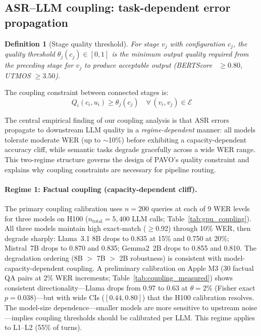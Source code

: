 \documentclass{article}
\newtheorem{definition}{Definition}
\begin{document}
\subsection{ASR--LLM coupling: task-dependent error propagation}
\label{sec:coupling}

\begin{definition}[Stage quality threshold]
For stage $v_j$ with configuration $c_j$, the quality threshold $\theta_j(c_j)\in[0,1]$ is the minimum output quality required from the preceding stage for $v_j$ to produce acceptable output (BERTScore~\citep{zhang2020bertscore,devlin2019bert} $\geq 0.80$, UTMOS $\geq 3.50$).
\end{definition}

The coupling constraint between connected stages is:
\begin{equation}
Q_i(c_i,u_i) \geq \theta_j(c_j) \quad \forall\,(v_i,v_j)\in\mathcal{E}
\label{eq:coupling}
\end{equation}

The central empirical finding of our coupling analysis is that ASR errors propagate to downstream LLM quality in a \emph{regime-dependent} manner: all models tolerate moderate WER (up to $\sim$10\%) before exhibiting a capacity-dependent accuracy cliff, while semantic tasks degrade gracefully across a wide WER range. This two-regime structure governs the design of PAVO's quality constraint and explains why coupling constraints are necessary for pipeline routing.

\paragraph{Regime 1: Factual coupling (capacity-dependent cliff).}
The primary coupling calibration uses $n=200$ queries at each of 9 WER levels for three models on H100 ($n_{\text{total}} = 5{,}400$ LLM calls; Table~\ref{tab:gpu_coupling}). All three models maintain high exact-match ($\geq$0.92) through 10\% WER, then degrade sharply: Llama~3.1 8B drops to 0.835 at 15\% and 0.750 at 20\%; Mistral~7B drops to 0.870 and 0.835; Gemma2~2B drops to 0.855 and 0.810. The degradation ordering (8B $>$ 7B $>$ 2B robustness) is consistent with model-capacity-dependent coupling. A preliminary calibration on Apple M3 (30 factual QA pairs at 2\% WER increments; Table~\ref{tab:coupling_measured}) shows consistent directionality---Llama drops from 0.97 to 0.63 at $\theta = 2\%$ (Fisher exact $p = 0.038$)---but with wide CIs ($[0.44, 0.80]$) that the H100 calibration resolves. The model-size dependence---smaller models are more sensitive to upstream noise---implies coupling thresholds should be calibrated per LLM. This regime applies to L1--L2 (55\% of turns).
\end{document}
